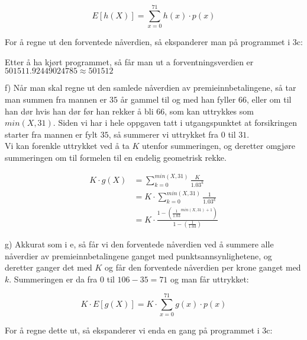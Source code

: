 \documentclass[12pt, a4paper]{article}
\begin{document}
\begin{equation}
    E[h(X)] = \sum_{x=0}^{71} h(x) \cdot p(x)
\end{equation}

For å regne ut den forventede nåverdien, så ekspanderer man på programmet i 3c:



Etter å ha kjørt programmet, så får man ut a forventningsverdien er $501511.92449024785 \approx 501512$

\newpage

f)
Når man skal regne ut den samlede nåverdien av premieinnbetalingene, så tar man summen fra mannen er $35$ år gammel til og med han fyller $66$, eller om til han dør hvis han dør før han rekker å bli $66$, som kan uttrykkes som $min(X, 31)$. 
Siden vi har i hele oppgaven tatt i utgangspunktet at forsikringen starter fra mannen er fylt $35$, så summerer vi uttrykket fra $0$ til $31$.\\
Vi kan forenkle uttrykket ved å ta $K$ utenfor summeringen, og deretter omgjøre summeringen om til formelen til en endelig geometrisk rekke.

\begin{equation}
    \begin{split}
        K \cdot g(X) &= \sum_{k=0}^{min(X, 31)} \frac{K}{1.03^k} \\
                     &= K \cdot \sum_{k=0}^{min(X, 31)} \frac{1}{1.03^k} \\
                     &= K \cdot \frac{1 - (\frac{1}{1.03}^{min(X, 31) + 1})}{1 - (\frac{1}{1.03})}
    \end{split}
\end{equation}

\newpage

g)
Akkurat som i e, så får vi den forventede nåverdien ved å summere alle nåverdier av premieinnbetalingene ganget med punktsannsynlighetene, 
og deretter ganger det med $K$ og får den forventede nåverdien per krone ganget med $k$. Summeringen er da fra $0$ til $106 - 35 = 71$ og man får uttrykket: 

\begin{equation}
    K \cdot E[g(X)] = K \cdot \sum_{x=0}^{71} g(x) \cdot p(x)
\end{equation}

For å regne dette ut, så ekspanderer vi enda en gang på programmet i 3c:


\end{document}
